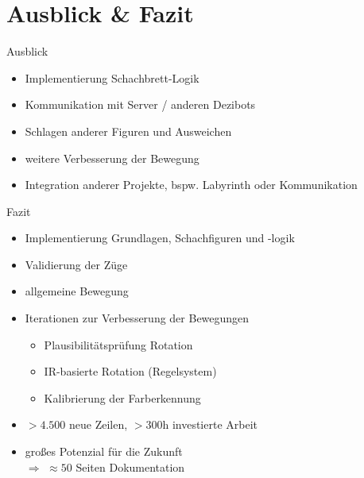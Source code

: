 
\section{Ausblick \& Fazit}

\begin{frame}{Ausblick}
    \begin{itemize}
        \item Implementierung Schachbrett-Logik
        \item Kommunikation mit Server / anderen Dezibots
        \item Schlagen anderer Figuren und Ausweichen
        \item weitere Verbesserung der Bewegung
        \item Integration anderer Projekte, bspw. Labyrinth oder Kommunikation
    \end{itemize}
\end{frame}

\begin{frame}{Fazit}
    \begin{itemize}
        \item Implementierung Grundlagen, Schachfiguren und -logik
        \item Validierung der Züge
        \item allgemeine Bewegung
        \item Iterationen zur Verbesserung der Bewegungen
        \begin{itemize}
            \item Plausibilitätsprüfung Rotation
            \item IR-basierte Rotation (Regelsystem)
            \item Kalibrierung der Farberkennung
        \end{itemize}
        \item $>4.500$ neue Zeilen, $>300$h investierte Arbeit
        \item großes Potenzial für die Zukunft \\
            $\Rightarrow$ $\approx50$ Seiten Dokumentation
    \end{itemize}
\end{frame}
